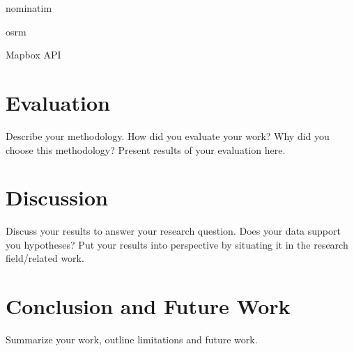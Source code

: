 nominatim

osrm

Mapbox API

\section{}

\section{Evaluation}
Describe your methodology. How did you evaluate your work? Why did you choose this methodology? Present results of your evaluation here.

\section{Discussion}
Discuss your results to answer your research question. Does your data support you hypotheses? Put your results into perspective by situating it in the research field/related work.

\section{Conclusion and Future Work}
Summarize your work, outline limitations and future work. 









